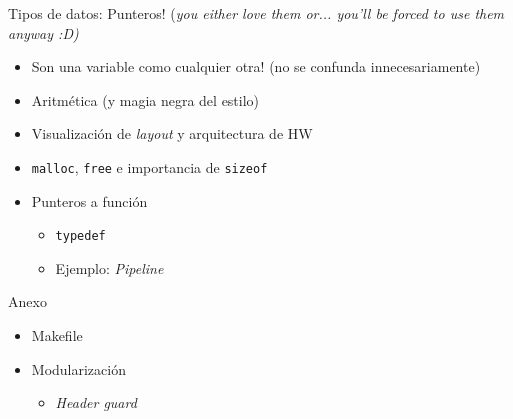 \documentclass{beamer}
\begin{document}
	\begin{frame}{Tipos de datos: Punteros! \tiny(\emph{you either love them or... you'll be forced to use them anyway :D)}}
		\begin{itemize}
			\item Son una variable como cualquier otra! (no se confunda innecesariamente)
			\item Aritmética (y magia negra del estilo)
			\item Visualización de \emph{layout} y arquitectura de HW
			\item \texttt{malloc}, \texttt{free} e importancia de \texttt{sizeof}
			\item Punteros a función
			\begin{itemize}
				\item \texttt{typedef}
				\item Ejemplo: \emph{Pipeline}
			\end{itemize}
		\end{itemize}
	\end{frame}
	
    \begin{frame}{Anexo}
    	\begin{itemize}
    		\item Makefile
    		\item Modularización
    		\begin{itemize}
	    		\item \emph{Header guard}
    		\end{itemize}
    	\end{itemize}
    \end{frame}
    
\end{document}
